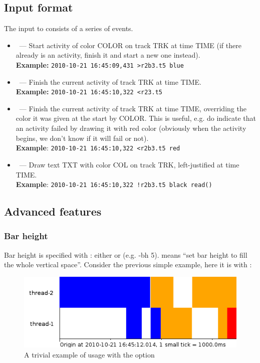 \documentclass{article}
\begin{document}
\pagebreak
\subsection{Input format}

The input to \splot{} consists of a series of events.

\begin{itemize}
 \item {}~--- Start activity of color COLOR on track TRK at time TIME (if there already is an activity, finish it and start a new one instead). \\
\textbf{Example:} \texttt{2010-10-21 16:45:09,431 >r2b3.t5 blue}
 \item {}~--- Finish the current activity of track TRK at time TIME. \\
\textbf{Example:} \texttt{2010-10-21 16:45:10,322 <r23.t5} 
 \item {}~--- Finish the current activity of track TRK at time TIME, overriding the color it was given at the start by COLOR. This is useful, e.g. do indicate that an activity failed by drawing it with red color (obviously when the activity begins, we don't know if it will fail or not). \\
\textbf{Example}: \texttt{2010-10-21 16:45:10,322 <r2b3.t5 red} 
 \item {}~--- Draw text TXT with color COL on track TRK, left-justified at time TIME. \\
\textbf{Example}: \texttt{2010-10-21 16:45:10,322 !r2b3.t5 black read()} 
\end{itemize}

\pagebreak
\subsection{Advanced features}

\subsubsection{Bar height}
Bar height is specified with : either  or  (e.g. -bh 5).  means ``set bar height to fill the whole vertical space''. Consider the previous simple example, here it is with :

\begin{figure}[h]
\center
\includegraphics[scale=0.5]{pics/splot/splot-simplest-example-fill.png}
\caption{A trivial example of \splot{} usage with the  option}
\end{figure}
\end{document}

